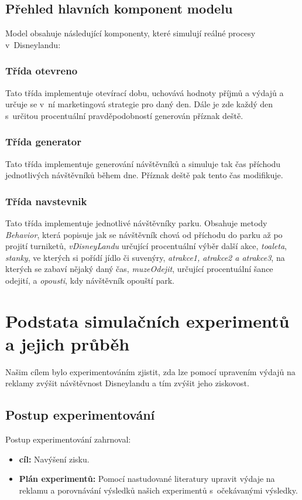 \section{Přehled hlavních komponent modelu} 
Model obsahuje následující komponenty, které simulují reálné procesy v~Disneylandu:


\subsection{Třída otevreno} Tato třída implementuje otevírací dobu, uchovává hodnoty příjmů a výdajů a určuje se v~ní marketingová strategie pro daný den. Dále je zde  každý den s~určitou procentuální pravděpodobností generován příznak deště.

\subsection{Třída generator} Tato třída implementuje generování návštěvníků a simuluje tak čas příchodu jednotlivých návštěvníků během dne. Příznak deště pak tento čas modifikuje.

\subsection{Třída navstevnik} Tato třída implementuje jednotlivé návštěvníky parku. Obsahuje metody \textit{Behavior}, která popisuje jak se návštěvník chová od příchodu do parku až po projití turniketů, \textit{vDisneyLandu} určující procentuální výběr další akce, \textit{toaleta}, \textit{stanky}, ve kterých si pořídí jídlo či suvenýry, \textit{atrakce1, atrakce2 a atrakce3}, na kterých se zabaví nějaký daný čas, \textit{muzeOdejit}, určující procentuální šance odejití, a \textit{opousti}, kdy návštěvník opouští park.
\chapter{Podstata simulačních experimentů a jejich průběh}
Našim cílem bylo experimentováním zjistit, zda lze pomocí upravením výdajů na reklamy zvýšit návštěvnost Disneylandu a tím zvýšit jeho ziskovost.
\section{Postup experimentování}
Postup experimentování zahrnoval:
\begin{itemize}
    \item \textbf{cíl:} Navýšení zisku.
    \item \textbf{Plán experimentů:} Pomocí nastudované literatury upravit výdaje na reklamu a porovnávání výsledků našich experimentů s~očekávanými výsledky. 
\end{itemize}

